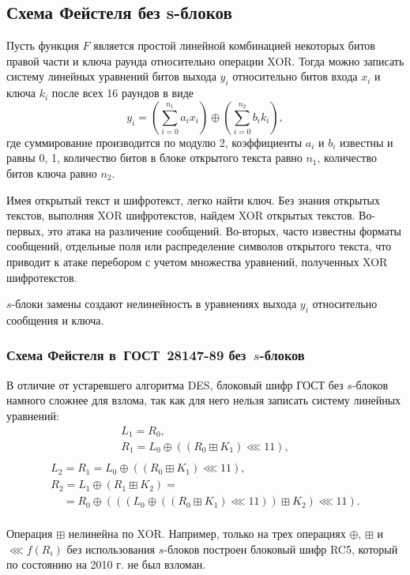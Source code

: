 \subsection{Схема Фейстеля без s-блоков}

Пусть функция $F$ является простой линейной комбинацией некоторых битов правой части и ключа раунда относительно операции XOR. Тогда можно записать систему линейных уравнений битов выхода $y_i$ относительно битов входа $x_i$ и ключа $k_i$ после всех 16 раундов в виде
    \[ y_i = (\sum_{i=0}^{n_1} a_i x_i) \oplus (\sum_{i=0}^{n_2} b_i k_i), \]
где суммирование производится по модулю 2, коэффициенты $a_i$ и $b_i$ известны и равны 0, 1, количество битов в блоке открытого текста равно $n_1$, количество битов ключа равно $n_2$.

Имея открытый текст и шифротекст, легко найти ключ. Без знания открытых текстов, выполняя XOR шифротекстов, найдем XOR открытых текстов. Во-первых, это атака на различение сообщений. Во-вторых, часто известны форматы сообщений, отдельные поля или распределение символов открытого текста, что приводит к атаке перебором с учетом множества уравнений, полученных XOR шифротекстов.

$s$-блоки замены создают нелинейность в уравнениях выхода $y_i$ относительно сообщения и ключа.


\subsubsection[Схема Фейстеля в ГОСТ 28147-89 без $s$-блоков]{Схема Фейстеля в~ГОСТ~28147-89 без~$s$-блоков}

В отличие от устаревшего алгоритма DES, блоковый шифр ГОСТ без $s$-блоков намного сложнее для взлома, так как для него нельзя записать систему линейных уравнений:
\[
    \begin{array}{l}
        L_1 = R_0, \\
        R_1 = L_0 \oplus ((R_0 \boxplus K_1) \lll 11), \\
    \end{array}
\] \[
    \begin{array}{l}
        L_2 = R_1 = L_0 \oplus ((R_0 \boxplus K_1) \lll 11), \\
        R_2 = L_1 \oplus (R_1 \boxplus K_2)  = \\
        ~~~~~= R_0 \oplus (((L_0 \oplus ((R_0 \boxplus K_1) \lll 11)) \boxplus K_2) \lll 11). \\
    \end{array}
\]

Операция $\boxplus$ нелинейна по XOR. Например, только на трех операциях $\oplus$, $\boxplus$ и $\lll f(R_i)$ без использования $s$-блоков построен блоковый шифр RC5, который по состоянию на 2010 г. не был взломан.

